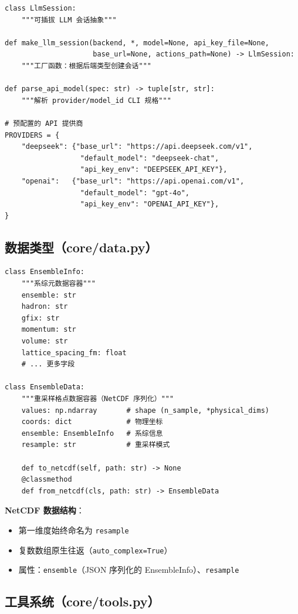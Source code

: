 \documentclass[12pt,a4paper]{ctexart}
\begin{document}
\begin{lstlisting}[style=pycode]
class LlmSession:
    """可插拔 LLM 会话抽象"""

def make_llm_session(backend, *, model=None, api_key_file=None,
                     base_url=None, actions_path=None) -> LlmSession:
    """工厂函数：根据后端类型创建会话"""

def parse_api_model(spec: str) -> tuple[str, str]:
    """解析 provider/model_id CLI 规格"""

# 预配置的 API 提供商
PROVIDERS = {
    "deepseek": {"base_url": "https://api.deepseek.com/v1",
                  "default_model": "deepseek-chat",
                  "api_key_env": "DEEPSEEK_API_KEY"},
    "openai":   {"base_url": "https://api.openai.com/v1",
                  "default_model": "gpt-4o",
                  "api_key_env": "OPENAI_API_KEY"},
}
\end{lstlisting}

\subsection{数据类型（core/data.py）}

\begin{lstlisting}[style=pycode]
class EnsembleInfo:
    """系综元数据容器"""
    ensemble: str
    hadron: str
    gfix: str
    momentum: str
    volume: str
    lattice_spacing_fm: float
    # ... 更多字段

class EnsembleData:
    """重采样格点数据容器（NetCDF 序列化）"""
    values: np.ndarray       # shape (n_sample, *physical_dims)
    coords: dict             # 物理坐标
    ensemble: EnsembleInfo   # 系综信息
    resample: str            # 重采样模式

    def to_netcdf(self, path: str) -> None
    @classmethod
    def from_netcdf(cls, path: str) -> EnsembleData
\end{lstlisting}

\textbf{NetCDF 数据结构}：
\begin{itemize}[itemsep=2pt]
    \item 第一维度始终命名为 \texttt{resample}
    \item 复数数组原生往返（\texttt{auto\_complex=True}）
    \item 属性：\texttt{ensemble}（JSON 序列化的 EnsembleInfo）、\texttt{resample}
\end{itemize}

\subsection{工具系统（core/tools.py）}
\end{document}
